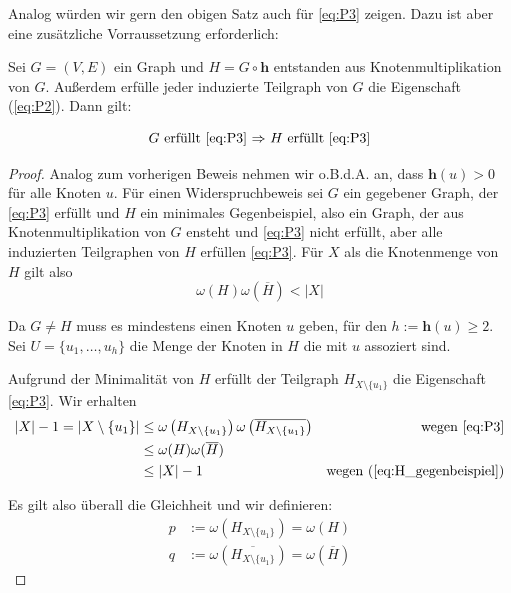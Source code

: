 \documentclass[../main.tex]{subfiles}
\begin{document}
Analog würden wir gern den obigen Satz auch für \eqref{eq:P3} zeigen. Dazu ist aber eine zusätzliche Vorraussetzung erforderlich:

\begin{satz}\label{thm:lemma3.2}
    Sei $G = (V, E)$ ein Graph und $H = G \circ \mathbf h$ entstanden aus Knotenmultiplikation von $G$. Außerdem erfülle jeder induzierte Teilgraph von $G$ die Eigenschaft (\ref{eq:P2}). Dann gilt:
    
    \begin{equation*}
        \text{$G$ erfüllt \eqref{eq:P3} $\Rightarrow$ $H$ erfüllt \eqref{eq:P3}}
    \end{equation*}
\end{satz}
\begin{proof}
    Analog zum vorherigen Beweis nehmen wir o.B.d.A. an, dass $\mathbf h(u) > 0$ für alle Knoten $u$. Für einen Widerspruchbeweis sei $G$ ein gegebener Graph, der \eqref{eq:P3} erfüllt und $H$ ein minimales Gegenbeispiel, also ein Graph, der aus Knotenmultiplikation von $G$ ensteht und \eqref{eq:P3} nicht erfüllt, aber alle induzierten Teilgraphen von $H$ erfüllen \eqref{eq:P3}. Für $X$ als die Knotenmenge von $H$ gilt also
    \begin{equation}\label{eq:H_gegenbeispiel}
        \omega(H)\omega(\overline H) < |X|
    \end{equation}

    Da $G \neq H$ muss es mindestens einen Knoten $u$ geben, für den $h := \mathbf h(u) \geq 2$. Sei $U = \{u_1, \hdots, u_h\}$ die Menge der Knoten in $H$ die mit $u$ assoziert sind.
    
    Aufgrund der Minimalität von $H$ erfüllt der Teilgraph $H_{X\setminus\{u_1\}}$ die Eigenschaft \eqref{eq:P3}. Wir erhalten
    \begin{align*}
        |X| - 1 = |X\setminus\{u_1\}| &\leq \omega\left(H_{X\setminus\{u_1\}}\right) \omega\left(\overline{H_{X\setminus\{u_1\}}}\right) &\text{wegen \eqref{eq:P3}}\\
        &\leq \omega(H)\omega(\overline H) \\
        &\leq |X| - 1 &\text{wegen (\ref{eq:H_gegenbeispiel})}
    \end{align*}

    Es gilt also überall die Gleichheit und wir definieren:
    \begin{align*}
        p &:= \omega\left(H_{X\setminus\{u_1\}}\right) = \omega(H) \\
        q &:= \omega\left(\overline{H_{X\setminus\{u_1\}}}\right) = \omega(\overline H)
    \end{align*}
    

\end{proof}
\end{document}

